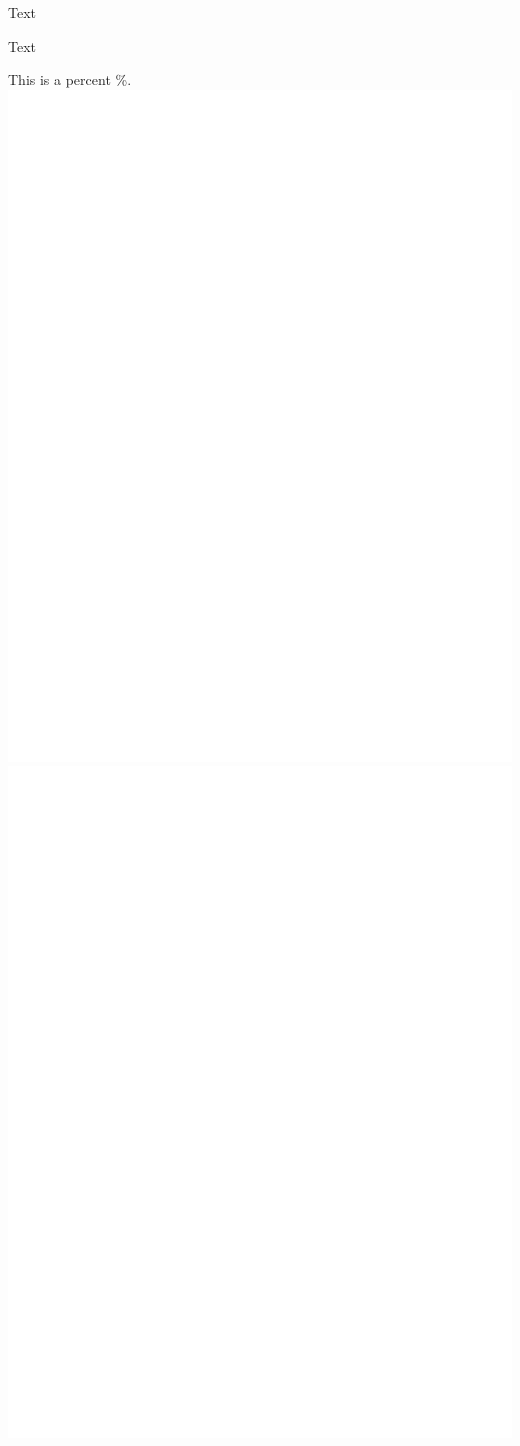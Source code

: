 
Text

Text%


This is a percent \%.
\includegraphics{images/im1_included.jpg}
\includegraphics{images/im3_included.jpg}
